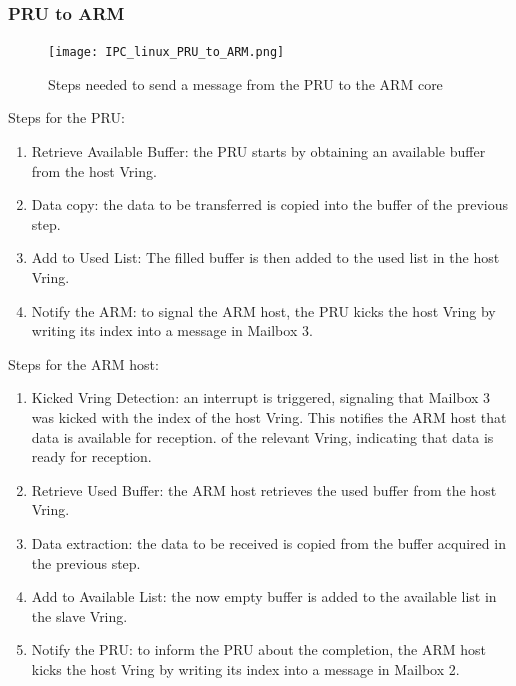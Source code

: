 \subsubsection{PRU to ARM}

\begin{figure}[htb]
    \centering
    \texttt{[image: IPC\_linux\_PRU\_to\_ARM.png]}
    \caption{Steps needed to send a message from the PRU to the ARM core}
\end{figure}

Steps for the PRU:

\begin{enumerate}
    \item   Retrieve Available Buffer: the PRU starts by obtaining an
            available buffer from the host Vring.
    \item   Data copy: the data to be transferred is copied into the buffer 
            of the previous step.
    \item   Add to Used List: The filled buffer is then added to the
            used list in the host Vring.
    \item   Notify the ARM: to signal the ARM host, the PRU kicks the host 
            Vring by writing its index into a message in Mailbox 3.
\end{enumerate}

Steps for the ARM host:

\begin{enumerate}
    \item   Kicked Vring Detection: an interrupt is triggered, signaling that
            Mailbox 3 was kicked with the index of the host Vring.
            This notifies the ARM host that data is available for reception.
            of the relevant Vring, indicating that data is ready for reception.
    \item   Retrieve Used Buffer: the ARM host retrieves the used buffer
            from the host Vring.
    \item   Data extraction: the data to be received is copied from the buffer
            acquired in the previous step.
    \item   Add to Available List: the now empty buffer is added to the
            available list in the slave Vring.
    \item   Notify the PRU: to inform the PRU about the completion,
            the ARM host kicks the host Vring by writing its index into a
            message in Mailbox 2.
\end{enumerate}

